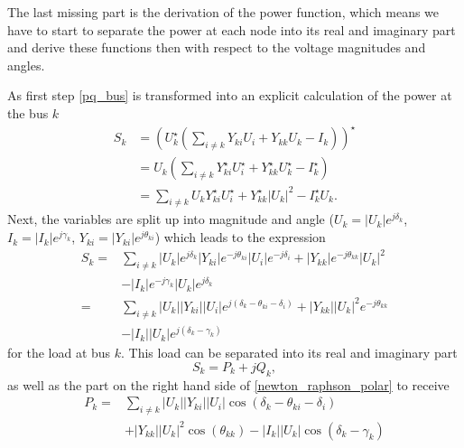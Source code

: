 The last missing part is the derivation of the power function, which means we have to start to separate the power at each node into its real and imaginary part and derive these functions then with respect to the voltage magnitudes and angles.

As first step \eqref{pq_bus} is transformed into an explicit calculation of the power at the bus $k$
\begin{align}
	S_k &= \left( U_k^\star \left( \sum_{i \ne k} Y_{ki} U_i + Y_{kk} U_k - I_k \right) \right)^\star \\
		&= U_k \left( \sum_{i \ne k} Y_{ki}^\star U_i^\star + Y_{kk}^\star U_k^\star - I_k^\star \right) \\
		&= \sum_{i \ne k} U_k Y_{ki}^\star U_i^\star + Y_{kk}^\star |U_k|^2 - I_k^\star U_k.
	\label{eq:complex_power}
\end{align}
Next, the variables are split up into magnitude and angle ($U_k = |U_k| e^{j \delta_k}$, $I_k = |I_k| e^{j \gamma_k}$, $Y_{ki} = |Y_{ki}| e^{j \theta_{ki}}$) which leads to the expression
\begin{equation}
	\begin{split}
		S_k = 	& \sum_{i \ne k} |U_k| e^{j \delta_k} |Y_{ki}| e^{-j \theta_{ki}} |U_i| e^{-j \delta_i} + |Y_{kk}| e^{-j \theta_{kk}} |U_k|^2 \\
				& - |I_k| e^{-j \gamma_k} |U_k| e^{j \delta_k} \\
			= 	& \sum_{i \ne k} |U_k| |Y_{ki}| |U_i| e^{j \left( \delta_k - \theta_{ki} - \delta_i \right)} + |Y_{kk}| |U_k|^2 e^{-j \theta_{kk}} \\
				& - |I_k| |U_k| e^{j \left( \delta_k - \gamma_k \right)}
	\end{split}
	\label{eq:newton_raphson_polar}
\end{equation}
for the load at bus $k$. This load can be separated into its real and imaginary part
\begin{equation}
	S_k = P_k + j Q_k,
\end{equation}
as well as the part on the right hand side of \eqref{newton_raphson_polar} to receive
\begin{equation}
	\begin{split}
		P_k = 	& \sum_{i \ne k} |U_k| |Y_{ki}| |U_i| \cos \left( \delta_k - \theta_{ki} - \delta_i \right) \\
				& + |Y_{kk}| |U_k|^2 \cos \left( \theta_{kk} \right) - |I_k| |U_k| \cos \left( \delta_k - \gamma_k \right)
	\end{split}
\end{equation}
